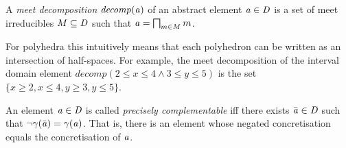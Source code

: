 \begin{definition}
A \emph{meet decomposition} ${\mathit{decomp}}(\mathit{a})$ of an abstract
element $\mathit{a} \in \mathit{D}$ is a set of meet irreducibles $M \subseteq \mathit{D}$ such that 
$\mathit{a}=\bigsqcap_{m\in M} m$.
\end{definition}

\noindent For polyhedra this intuitively means that each polyhedron can be
written as an intersection of half-spaces.
%
For example, the meet decomposition of the interval domain element
$decomp(2\leq x\leq 4 \wedge 3\leq y\leq 5)$ is
the set $\{x\geq 2, x\leq 4, y\geq 3, y\leq 5\}$.

\begin{definition} 
An element $\mathit{a}\in \mathit{D}$ is called \emph{precisely complementable}
iff there exists $\bar{\mathit{a}} \in \mathit{D}$ such that $\neg\gamma(\bar{\mathit{a}})=\gamma(\mathit{a})$.
That is, there is an element whose negated concretisation equals
the concretisation of $\mathit{a}$.
\end{definition}

